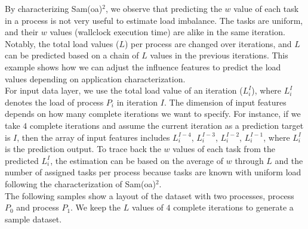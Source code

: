 By characterizing Sam(oa)$^2$, we observe that predicting the $w$ value of each task in a process is not very useful to estimate load imbalance. The tasks are uniform, and their $w$ values (wallclock execution time) are alike in the same iteration. Notably, the total load values ($L$) per process are changed over iterations, and $L$ can be predicted based on a chain of $L$ values in the previous iterations. This example shows how we can adjust the influence features to predict the load values depending on application characterization.\\

For input data layer, we use the total load value of an iteration ($L^{I}_{i}$), where $L^{I}_{i}$ denotes the load of process $P_{i}$ in iteration $I$. The dimension of input features depends on how many complete iterations we want to specify. For instance, if we take $4$ complete iterations and assume the current iteration as a prediction target is $I$, then the array of input features includes $L^{I-4}_{i}$, $L^{I-3}_{i}$, $L^{I-2}_{i}$, $L^{I-1}_{i}$, where $L^{I}_{i}$ is the prediction output. To trace back the $w$ values of each task from the predicted $L^{I}_{i}$, the estimation can be based on the average of $w$ through $L$ and the number of assigned tasks per process because tasks are known with uniform load following the characterization of Sam(oa)$^2$.\\

The following samples show a layout of the dataset with two processes, process $P_{0}$ and process $P_{1}$. We keep the $L$ values of $4$ complete iterations to generate a sample dataset.

